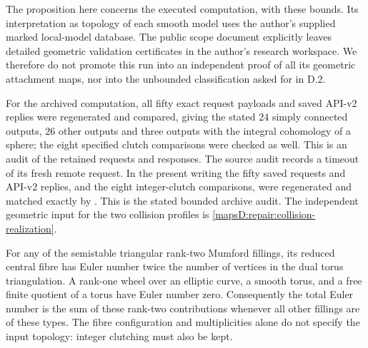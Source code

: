 \begin{computed}
The proposition here concerns the executed computation, with these
bounds. Its interpretation as topology of each smooth model uses
the author's supplied marked local-model database. The public scope
document explicitly leaves detailed geometric validation certificates
in the author's research workspace. We therefore do not promote this
run into an independent proof of all its geometric attachment maps,
nor into the unbounded classification asked for in D.2.

For the archived computation, all fifty exact request payloads and
saved API-v2 replies were regenerated and compared, giving the stated
$24$ simply connected outputs, $26$ other outputs and three outputs
with the integral cohomology of a sphere; the eight specified clutch
comparisons were checked as well.
This is an audit of the retained requests and responses.  The source audit records a timeout of its fresh remote request. In the present writing the fifty saved requests and API-v2 replies, and the eight integer-clutch comparisons, were regenerated and matched exactly by . This is the stated bounded archive audit.  The independent geometric input for the two
collision profiles is \cref{mapsD:repair:collision-realization}.


\end{computed}


\begin{proposition}\label{maps:src:D.2.3}


For any of the semistable triangular rank-two Mumford fillings, its
reduced central fibre has Euler number twice the number of vertices
in the dual torus triangulation. A rank-one wheel over an elliptic
curve, a smooth torus, and a free finite quotient of a torus have
Euler number zero. Consequently the total Euler number is the sum
of these rank-two contributions whenever all other fillings are of
these types. The fibre configuration and multiplicities alone do
not specify the input topology: integer clutching must also be kept.
\end{proposition}


